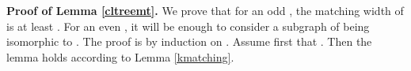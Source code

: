 \documentclass{article}
\begin{document}
\begin{comment}
Assume now that there are at least two vertices  and  of  whose corresponding cliques
 and  of  contain more white vertices than black ones. Observe that  and 
are not adjacent because otherwise  is a black edge in contradiction to our assumption.
Assume first that there are two different vertices  and  of  being neighbors of 
 and , respectively and let  and  be the cliques of  corresponding to 
and , respectively. Since  and  induce cliques of ,
we can match all the white vertices of  with the black ones and do the same regarding
. Since the number of white vertices in each of  is more than , the size of the 
resulting matching will be larger than . If the  and  do not exist then there is vertex
 which is the only neighbor of both  and  in . Let  be the corresponding clique
of  in . Denote by  the number 
of white vertices of , respectively. Denote  by . Since the edge between  and 
is white one, . On the other hand, since , . In  match white vertices with black
vertices so that all the black vertices of  are taken to the matching 
(this is possible since in  there are less black vertices than white ones)
plus additional black vertices of .
As a result there will be  (in fact more than ) unmatched black vertices in . These vertices can be matched with  white 
vertices of  existing since  constituting a matching of size . Thus we have established the
matching in the case where all the edges are white ones. The case where all the edges are black ones follows by symmetry.

Consider now the situation where  has both white and black edges. Since  is connected, its line graph is
connected as well. Consequently there are a white and a black edge that are adjacent i.e. have a common end. 
Let  and  be such white and black edge, respectively. Let  be the respective
vertex cliques of . For each  denote by  and  the respective number of white and black vertices 
of . It follows from our assumption that  and that . 
Assume that  and . Then the desired matching of size  can be obtained by matching
the white vertices of  with the black vertices of  and  and the black vertices of  with
white vertices of  and . Otherwise, assume, for example, that , that is 
implying that . It follows that , a contradiction to being  a white edge.
It remains to assume that  causing contradiction by symmetric reasoning. 
\end{comment}

{\bf Proof of Lemma \ref{cltreemt}.}
We prove that for an odd , the matching width of  is at least
. For an even , it will be enough to consider a subgraph of
 being isomorphic to .
The proof is by induction on .
Assume first that . Then the lemma holds according to
Lemma \ref{kmatching}.
\end{document}
